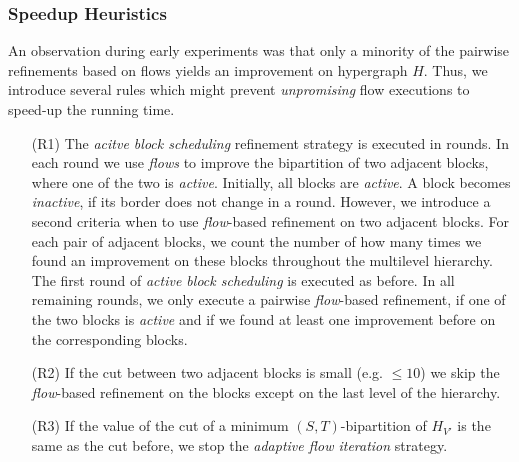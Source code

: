 \subsubsection*{Speedup Heuristics}
An observation during early experiments was that only a minority
of the pairwise refinements based on flows yields an improvement
on hypergraph $H$. Thus, we introduce several rules which might prevent
\emph{unpromising} flow executions to speed-up the running time.

\begin{enumerate}
\item[(R1)] The \emph{acitve block scheduling} refinement strategy is executed in rounds. In each
            round we use \emph{flows} to improve the bipartition of two adjacent blocks, where 
            one of the two is \emph{active}. Initially, all blocks are \emph{active}. 
            A block becomes \emph{inactive}, if its border does not change in a round. 
            However, we introduce a second criteria when to use \emph{flow}-based refinement
            on two adjacent blocks. For each pair of adjacent blocks, we count the number of how
            many times we found an improvement on these blocks throughout the multilevel hierarchy.
            The first round of \emph{active block scheduling} is executed as before. In all remaining
            rounds, we only execute a pairwise \emph{flow}-based refinement, if one of the two 
            blocks is \emph{active} and if we found at least one improvement before on the
            corresponding blocks.
\item[(R2)] If the cut between two adjacent blocks is small (e.g. $\le 10$) we
            skip the \emph{flow}-based refinement on the blocks except on the last level of the hierarchy.
\item[(R3)] If the value of the cut of a minimum $(S,T)$-bipartition of $H_{V'}$ is the same 
            as the cut before, we stop the \emph{adaptive flow iteration} strategy.
\end{enumerate}


